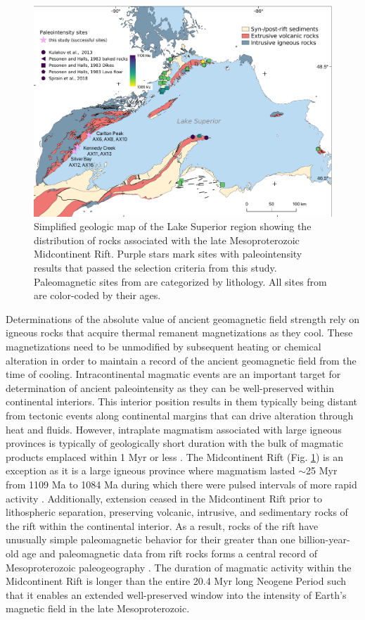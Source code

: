 \documentclass[9pt,twocolumn,twoside,lineno]{pnas-new}
\begin{document}
\begin{figure}
\centering
\noindent\includegraphics[width=11.4 cm]{Geologic_map.pdf}
\caption{\footnotesize{Simplified geologic map of the Lake Superior region showing the distribution of rocks associated with the late Mesoproterozoic Midcontinent Rift. Purple stars mark sites with paleointensity results that passed the selection criteria from this study. Paleomagnetic sites from \citealp{Pesonen1983a} are categorized by lithology. All sites from  \citealp{Pesonen1983a, Kulakov2013a, Sprain2018a} are color-coded by their ages.}}
\label{fig:Geologic_map}
\end{figure}

Determinations of the absolute value of ancient geomagnetic field strength rely on igneous rocks that acquire thermal remanent magnetizations as they cool. These magnetizations need to be unmodified by subsequent heating or chemical alteration in order to maintain a record of the ancient geomagnetic field from the time of cooling. Intracontinental magmatic events are an important target for determination of ancient paleointensity as they can be well-preserved within continental interiors. This interior position results in them typically being distant from tectonic events along continental margins that can drive alteration through heat and fluids. However, intraplate magmatism associated with large igneous provinces is typically of geologically short duration with the bulk of magmatic products emplaced within 1 Myr or less \cite{Kasbohm2021a}. The Midcontinent Rift (Fig. \ref{fig:Geologic_map}) is an exception as it is a large igneous province where magmatism lasted $\sim$25 Myr from  1109 Ma to 1084 Ma during which there were pulsed intervals of more rapid activity \cite{Swanson-Hysell2021a}. Additionally, extension ceased in the Midcontinent Rift prior to lithospheric separation, preserving volcanic, intrusive, and sedimentary rocks of the rift within the continental interior. As a result, rocks of the rift have unusually simple paleomagnetic behavior for their greater than one billion-year-old age and paleomagnetic data from rift rocks forms a central record of Mesoproterozoic paleogeography \cite{Swanson-Hysell2021c}. The duration of magmatic activity within the Midcontinent Rift is longer than the entire 20.4 Myr long Neogene Period such that it enables an extended well-preserved window into the intensity of Earth's magnetic field in the late Mesoproterozoic. 
\end{document}
